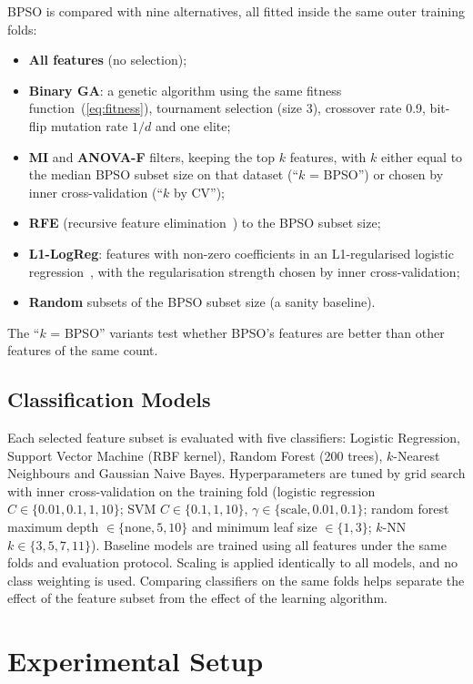 \documentclass[conference]{IEEEtran}
\begin{document}
BPSO is compared with nine alternatives, all fitted inside the same outer
training folds:
\begin{itemize}
\item \textbf{All features} (no selection);
\item \textbf{Binary GA}: a genetic algorithm using the same fitness
function~(\ref{eq:fitness}), tournament selection (size 3), crossover rate
0.9, bit-flip mutation rate $1/d$ and one elite;
\item \textbf{MI} and \textbf{ANOVA-F} filters, keeping the top $k$ features,
with $k$ either equal to the median BPSO subset size on that dataset
(``$k$ = BPSO'') or chosen by inner cross-validation (``$k$ by CV'');
\item \textbf{RFE} (recursive feature elimination~\cite{guyon2002}) to the
BPSO subset size;
\item \textbf{L1-LogReg}: features with non-zero coefficients in an
L1-regularised logistic regression~\cite{tibshirani1996}, with the
regularisation strength chosen by inner cross-validation;
\item \textbf{Random} subsets of the BPSO subset size (a sanity baseline).
\end{itemize}
The ``$k$ = BPSO'' variants test whether BPSO's features are better than other
features of the same count.

\subsection{Classification Models}

Each selected feature subset is evaluated with five classifiers: Logistic
Regression, Support Vector Machine (RBF kernel), Random Forest (200 trees),
$k$-Nearest Neighbours and Gaussian Naive Bayes. Hyperparameters are tuned by
grid search with inner cross-validation on the training fold (logistic
regression $C \in \{0.01, 0.1, 1, 10\}$; SVM $C \in \{0.1, 1, 10\}$,
$\gamma \in \{\text{scale}, 0.01, 0.1\}$; random forest maximum depth
$\in \{\text{none}, 5, 10\}$ and minimum leaf size $\in \{1, 3\}$; $k$-NN
$k \in \{3, 5, 7, 11\}$). Baseline models are trained using all features under
the same folds and evaluation protocol. Scaling is applied identically to all
models, and no class weighting is used. Comparing classifiers on the same
folds helps separate the effect of the feature subset from the effect of the
learning algorithm.

\section{Experimental Setup}
\end{document}
